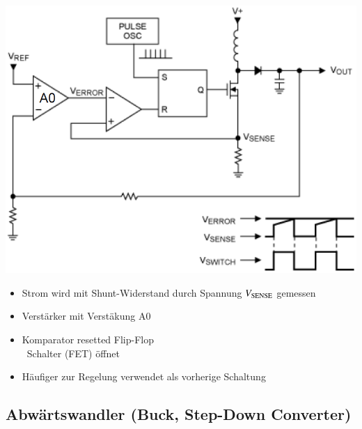 \begin{minipage}{0.42\columnwidth}
    \includegraphics[width=\columnwidth]{images/regelung_ausgangsspannung_current.png}
\end{minipage}
\hfill
\begin{minipage}{0.56\columnwidth}
    \begin{itemize}
        \item Strom wird mit Shunt-Widerstand durch Spannung $V_{\rm SENSE}$ gemessen
        \item Verstärker mit Verstäkung A0 %
        \item Komparator resetted Flip-Flop\\
        \textrightarrow\ Schalter (FET) öffnet
        \item Häufiger zur Regelung verwendet als vorherige Schaltung
    \end{itemize}
\end{minipage}


\subsection{Abwärtswandler (Buck, Step-Down Converter)}

\begin{minipage}[c]{0.4\columnwidth}
    
\end{minipage}
\hfill
\begin{minipage}[c]{0.58\columnwidth}
    
\end{minipage}

